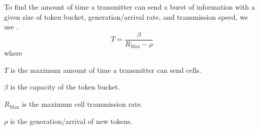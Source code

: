 To find the amount of time a transmitter can send a burst of information with a given size of token bucket, generation/arrival rate, and transmission speed, we use .
\begin{equation}\label{eq:Token_Bucket_Max_Burst_Time}
  T = \frac{\beta}{R_{\mathrm{Max}}-\rho}
\end{equation}
where
\begin{description}[noitemsep]
\item $T$ is the maximum amount of time a transmitter can send cells.
\item $\beta$ is the capacity of the token bucket.
\item $R_{\mathrm{Max}}$ is the maximum cell transmission rate.
\item $\rho$ is the generation/arrival of new tokens.
\end{description}

